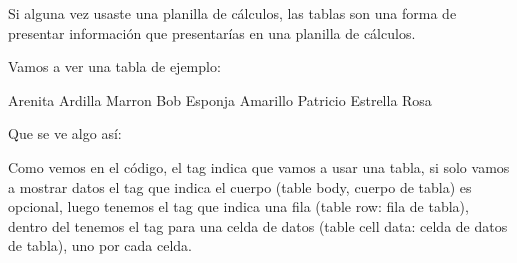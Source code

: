 \documentclass[letterpaper,10pt,spanish]{sphinxmanual}
\begin{document}
Si alguna vez usaste una planilla de cálculos, las tablas son una forma de
presentar información que presentarías en una planilla de cálculos.

Vamos a ver una tabla de ejemplo:

%
\begin{sphinxVerbatim}[commandchars=\\\{\}]
    Arenita
    Ardilla
    Marron
    Bob
    Esponja
    Amarillo
    Patricio
    Estrella
    Rosa
\end{sphinxVerbatim}

Que se ve algo así:



Como vemos en el código, el tag  indica que vamos a usar una tabla, si
solo vamos a mostrar datos el tag que indica el cuerpo  (table body,
cuerpo de tabla) es opcional, luego tenemos el tag que indica una fila 
(table row: fila de tabla), dentro del tenemos el tag para una celda de datos
 (table cell data: celda de datos de tabla), uno por cada celda.
\end{document}
